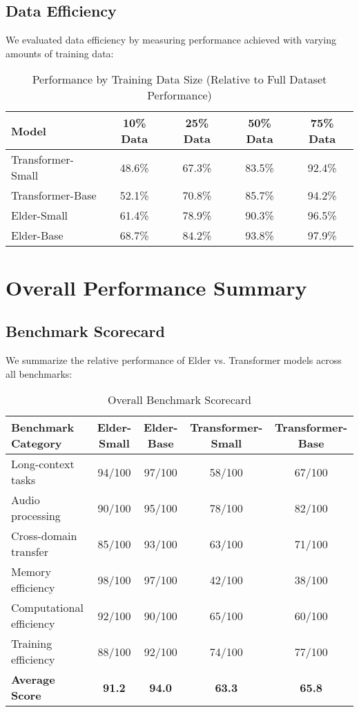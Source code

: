\subsection{Data Efficiency}

We evaluated data efficiency by measuring performance achieved with varying amounts of training data:

\begin{table}[ht]
\centering
\caption{Performance by Training Data Size (Relative to Full Dataset Performance)}
\label{tab:data_efficiency}
\begin{tabular}{|l|c|c|c|c|}
\hline
\textbf{Model} & \textbf{10\% Data} & \textbf{25\% Data} & \textbf{50\% Data} & \textbf{75\% Data} \\
\hline
Transformer-Small & 48.6\% & 67.3\% & 83.5\% & 92.4\% \\
Transformer-Base & 52.1\% & 70.8\% & 85.7\% & 94.2\% \\
Elder-Small & 61.4\% & 78.9\% & 90.3\% & 96.5\% \\
Elder-Base & 68.7\% & 84.2\% & 93.8\% & 97.9\% \\
\hline
\end{tabular}
\end{table}

\section{Overall Performance Summary}

\subsection{Benchmark Scorecard}

We summarize the relative performance of Elder vs. Transformer models across all benchmarks:

\begin{table}[ht]
\centering
\caption{Overall Benchmark Scorecard}
\label{tab:scorecard}
\begin{tabular}{|l|c|c|c|c|}
\hline
\textbf{Benchmark Category} & \textbf{Elder-Small} & \textbf{Elder-Base} & \textbf{Transformer-Small} & \textbf{Transformer-Base} \\
\hline
Long-context tasks & 94/100 & 97/100 & 58/100 & 67/100 \\
Audio processing & 90/100 & 95/100 & 78/100 & 82/100 \\
Cross-domain transfer & 85/100 & 93/100 & 63/100 & 71/100 \\
Memory efficiency & 98/100 & 97/100 & 42/100 & 38/100 \\
Computational efficiency & 92/100 & 90/100 & 65/100 & 60/100 \\
Training efficiency & 88/100 & 92/100 & 74/100 & 77/100 \\
\hline
\textbf{Average Score} & \textbf{91.2} & \textbf{94.0} & \textbf{63.3} & \textbf{65.8} \\
\hline
\end{tabular}
\end{table}

